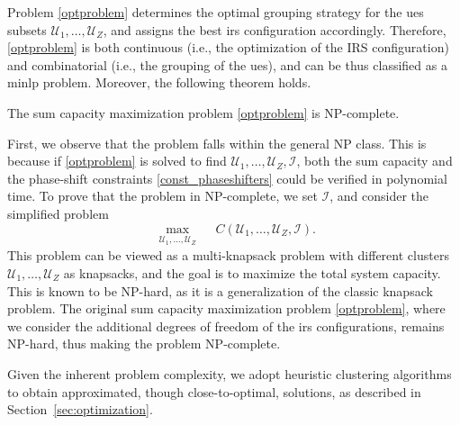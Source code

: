 Problem \eqref{optproblem} determines the optimal grouping strategy for the \glspl{ue} subsets $\mathcal{U}_1,\ldots,\mathcal{U}_{Z}$, and assigns the best \gls{irs} configuration accordingly. Therefore, \eqref{optproblem} is both continuous (i.e., the optimization of the IRS configuration) and combinatorial (i.e., the grouping of the \glspl{ue}), and can be thus classified as a \gls{minlp} problem.
Moreover, the following theorem holds.
\begin{theorem}
    The sum capacity maximization problem \eqref{optproblem} is NP-complete.
\end{theorem}
\begin{IEEEproof}
    First, we observe that the problem falls within the general NP class. This is because if \eqref{optproblem} is solved to find $\mathcal{U}_1, \ldots, \mathcal{U}_Z, \mathcal{I}$, both the sum capacity and the phase-shift constraints \eqref{const_phaseshifters} could be verified in polynomial time.
    To prove that the problem in NP-complete, we set $\mathcal{I}$, and consider the simplified problem
    \begin{equation}
        \max_{\substack{\mathcal{U}_1,\ldots,\mathcal{U}_{Z}}} \quad  C(\mathcal{U}_1,\ldots,\mathcal{U}_{Z},\mathcal{I}).
    \end{equation}
     This problem can be viewed as a multi-knapsack problem with different clusters $\mathcal{U}_1, \ldots, \mathcal{U}_Z$ as knapsacks, and the goal is to maximize the total system capacity.
     This is known to be NP-hard, as it is a generalization of the classic knapsack problem. 
     The original sum capacity maximization problem \eqref{optproblem}, where we consider the additional degrees of freedom of the \gls{irs} configurations, remains NP-hard, thus making the problem NP-complete.
\end{IEEEproof}

Given the inherent problem complexity, we adopt heuristic clustering algorithms to obtain approximated, though close-to-optimal, solutions, as described in Section~\ref{sec:optimization}.

